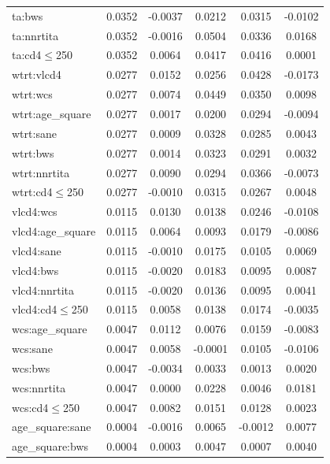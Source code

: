 \documentclass[10pt]{NSP1}
\begin{document}
\begin{table}[t]
\begin{tabular}{@{}lccccc@{}}
        ta:bws              & 0.0352 & -0.0037 & 0.0212 & 0.0315 & -0.0102 \\
        ta:nnrtita          & 0.0352 & -0.0016 & 0.0504 & 0.0336 & 0.0168 \\
        ta:cd4$\leq$250        & 0.0352 & 0.0064 & 0.0417 & 0.0416 & 0.0001 \\
        wtrt:vlcd4          & 0.0277 & 0.0152 & 0.0256 & 0.0428 & -0.0173 \\
        wtrt:wcs            & 0.0277 & 0.0074 & 0.0449 & 0.0350 & 0.0098 \\
        wtrt:age\_square    & 0.0277 & 0.0017 & 0.0200 & 0.0294 & -0.0094 \\
        wtrt:sane           & 0.0277 & 0.0009 & 0.0328 & 0.0285 & 0.0043 \\
        wtrt:bws            & 0.0277 & 0.0014 & 0.0323 & 0.0291 & 0.0032 \\
        wtrt:nnrtita        & 0.0277 & 0.0090 & 0.0294 & 0.0366 & -0.0073 \\
        wtrt:cd4$\leq$250      & 0.0277 & -0.0010 & 0.0315 & 0.0267 & 0.0048 \\
        vlcd4:wcs           & 0.0115 & 0.0130 & 0.0138 & 0.0246 & -0.0108 \\
        vlcd4:age\_square   & 0.0115 & 0.0064 & 0.0093 & 0.0179 & -0.0086 \\
        vlcd4:sane          & 0.0115 & -0.0010 & 0.0175 & 0.0105 & 0.0069 \\
        vlcd4:bws           & 0.0115 & -0.0020 & 0.0183 & 0.0095 & 0.0087 \\
        vlcd4:nnrtita       & 0.0115 & -0.0020 & 0.0136 & 0.0095 & 0.0041 \\
        vlcd4:cd4$\leq$250     & 0.0115 & 0.0058 & 0.0138 & 0.0174 & -0.0035 \\
        wcs:age\_square     & 0.0047 & 0.0112 & 0.0076 & 0.0159 & -0.0083 \\
        wcs:sane            & 0.0047 & 0.0058 & -0.0001 & 0.0105 & -0.0106 \\
        wcs:bws             & 0.0047 & -0.0034 & 0.0033 & 0.0013 & 0.0020 \\
        wcs:nnrtita         & 0.0047 & 0.0000 & 0.0228 & 0.0046 & 0.0181 \\
        wcs:cd4$\leq$250       & 0.0047 & 0.0082 & 0.0151 & 0.0128 & 0.0023 \\
        age\_square:sane    & 0.0004 & -0.0016 & 0.0065 & -0.0012 & 0.0077 \\
        age\_square:bws     & 0.0004 & 0.0003 & 0.0047 & 0.0007 & 0.0040 \\

\end{tabular}
\end{table}
\end{document}
